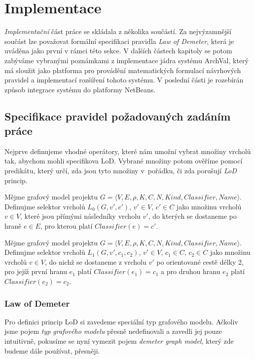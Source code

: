 \chapter{Implementace}
\label{implementation}
\emph{Implementační} část práce se skládala z několika součástí. Za nejvýzamnější součást lze považovat formální specifikaci pravidla \emph{Law of Demeter}, která je uváděna jako první v rámci této sekce. V dalších částech kapitoly se potom zabýváme vybranými poznámkami z implementace jádra systému ArchVal, který má sloužit jako platforma pro provádění matematických formulací návrhových pravidel a implementací rozšíření tohoto systému. V poslední části je rozebírán způsob integrace systému do platformy NetBeans.

\section{Specifikace pravidel požadovaných zadáním práce}
Nejprve definujeme vhodné operátory, které nám umožní vybrat množiny vrcholů tak, abychom mohli specifikova LoD. Vybrané množiny potom ověříme pomocí predikátu, který určí, zda jsou tyto množiny v~pořádku, či zda porušují \emph{LoD} princip.

\begin{definition}
Mějme grafový model projektu $G = \langle V, E, \rho, K, C, N, \mathit{Kind}, \mathit{Classifier}, \mathit{Name}\rangle$. Definujme selektor vrcholů $L_0(G, v', c')$, $v' \in V$, $c' \in C$ jako množinu vrcholů $v \in V$, které jsou přímými následníky vrcholu $v'$, do kterých se dostaneme po hraně $e \in E$, pro kterou platí $Classifier(e) = c' $.
\end{definition}

\begin{definition}
Mějme grafový model projektu $G = \langle V, E, \rho, K, C, N, \mathit{Kind}, \mathit{Classifier}, \mathit{Name}\rangle$. Definujme selektor vrcholů $L_1(G, v', c_1, c_2)$, $v' \in V$, $c_1 \in C$, $c_2 \in C$ jako množinu vrcholů $v \in V$, do nichž se dostaneme z vrcholu $v'$ po orientované cestě délky 2, pro jejíž první hranu $e_1$ platí $Classifier(e_1) = c_1$ a pro druhou hranu $e_2$ platí $Classifier(e_2) = c_2$.
\end{definition}

\subsection{Law of Demeter}
\label{implementation-lod_specification}
Pro definici princip LoD si zavedeme speciální typ grafového modelu. Ačkoliv jsme pojem \emph{typ grafového modelu}  přesně nedefinovali a zavedli jej pouze intuitivně, pokusíme se nyní vymezit pojem \emph{demeter graph model}, který zde budeme dále používat, přesněji.

